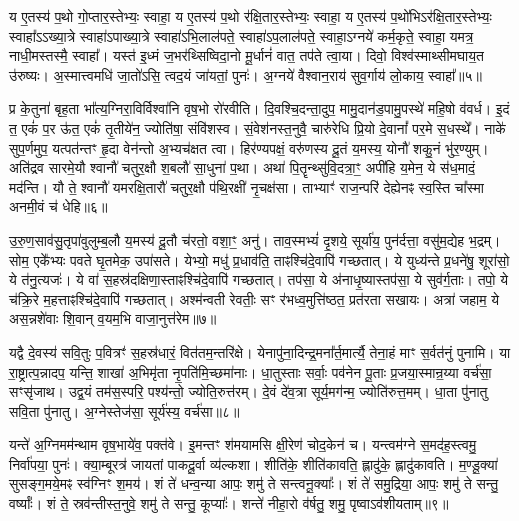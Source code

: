 य ए॒तस्य॑ प॒थो गो॒प्तार॒स्तेभ्यः॒ स्वाहा॒ य ए॒तस्य॑ प॒थो र॑क्षि॒तार॒स्तेभ्यः॒ स्वाहा॒ य ए॒तस्य॑ प॒थो॑भिऽर॑क्षि॒तार॒स्तेभ्यः॒ स्वाहा᳚\-ऽ\-ऽ\-ख्या॒त्रे स्वाहा॑ऽपाख्या॒त्रे स्वाहा॑ऽभि॒लाल॑पते॒ स्वाहा॑ऽ\-प॒लाल॑\-पते॒ स्वाहा॒ऽग्नये॑ कर्म॒कृते॒ स्वाहा॒ यमत्र॒ नाधी॒मस्तस्मै॒ स्वाहा᳚। 
यस्त॑ इ॒ध्मं ज॒भर॑थ्सिष्विदा॒नो मू॒र्धानं॑ वात॒ तप॑ते त्वा॒या। 
दिवो॒ विश्व॑स्माथ्सीमघाय॒त उ॑रुष्यः। 
अ॒स्मात्त्वमधि॑ जा॒तो॑ऽसि॒ त्वद॒यं जा॑यतां॒ पुनः॑। 
अ॒ग्नये॑ वैश्वान॒राय॑ सुव॒र्गाय॑ लो॒काय॒ स्वाहा᳚॥५॥
\anuvakamend[य ए॒तस्य॒ त्वत्पञ्च॑]

प्र के॒तुना॑ बृह॒ता भा᳚त्य॒ग्निरा॒विर्विश्वा॑नि वृष॒भो रो॑रवीति। 
दि॒वश्चि॒दन्ता॒दुप॒ मामु॒दान॑ड॒पामु॒पस्थे॑ महि॒षो व॑वर्ध। 
इ॒दं त॒ एकं॑ प॒र ऊ॑त॒ एकं॑ तृ॒तीये॑न॒ ज्योति॑षा॒ संवि॑शस्व। 
सं॒वेश॑नस्त॒नुवै॒ चारु॑रेधि प्रि॒यो दे॒वानां᳚ पर॒मे स॒धस्थे᳚। 
नाके॑ सुप॒र्णमुप॒ यत्पत॑न्तꣳ हृ॒दा वेन॑न्तो अ॒भ्यच॑क्षत त्वा। 
हिर॑ण्यपक्षं॒ वरु॑णस्य दू॒तं य॒मस्य॒ योनौ॑ शकु॒नं भु॑र॒ण्युम्। 
अति॑द्रव सारमे॒यौ श्वानौ॑ चतुर॒क्षौ श॒बलौ॑ सा॒धुना॑ प॒था। 
अथा॑ पि॒तॄन्थ्सु॑वि॒दत्रा॒ꣳ॒ अपी॑हि य॒मेन॒ ये स॑ध॒मादं॒ मद॑न्ति। 
यौ ते॒ श्वानौ॑ यमरक्षि॒तारौ॑ चतुर॒क्षौ प॑थि॒रक्षी॑ नृ॒चक्ष॑सा। 
ताभ्याꣳ॑ राज॒न्परि॑ देह्येनꣴ स्व॒स्ति चा᳚स्मा अनमी॒वं च॑ धेहि॥६॥

उ॒रु॒ण॒साव॑सु॒तृपा॑वुलुम्ब॒लौ य॒मस्य॑ दू॒तौ च॑रतो॒ वशा॒ꣳ॒ अनु॑। 
ताव॒स्मभ्यं॑ दृ॒शये॒ सूर्या॑य॒ पुन॑र्दत्ता॒ वसु॑म॒द्येह भ॒द्रम्। 
सोम॒ एके᳚भ्यः पवते घृ॒तमेक॒ उपा॑सते। 
येभ्यो॒ मधु॑ प्र॒धाव॑ति॒ ताꣴश्चि॑दे॒वापि॑ गच्छतात्। 
ये युध्य॑न्ते प्र॒धने॑षु॒ शूरा॑सो॒ ये त॑नु॒त्यजः॑। 
ये वा॑ स॒हस्र॑दक्षिणा॒स्ताꣴश्चि॑दे॒वापि॑ गच्छतात्। 
तप॑सा॒ ये अ॑नाधृ॒ष्यास्तप॑सा॒ ये सुव॑र्ग॒ताः। 
तपो॒ ये च॑क्रि॒रे म॒हत्ताꣴश्चि॑दे॒वापि॑ गच्छतात्। 
अश्म॑न्वती रेवतीः॒ सꣳ र॑भध्व॒मुत्ति॑ष्ठत॒ प्रत॑रता सखायः। 
अत्रा॑ जहाम॒ ये अस॒न्नशे॑वाः  शि॒वान् व॒यम॒भि वाजा॒नुत्त॑रेम॥७॥

यद्वै दे॒वस्य॑ सवि॒तुः प॒वित्रꣳ॑ स॒हस्र॑धारं॒  वित॑तम॒न्तरि॑क्षे। 
येनापु॑ना॒दिन्द्र॒मना᳚र्त॒मार्त्यै॒ तेना॒हं माꣳ स॒र्वत॑नुं पुनामि। 
या रा॒ष्ट्रात्प॒न्नादप॒ यन्ति॒ शाखा॑ अ॒भिमृ॑ता नृ॒पति॑मि॒च्छमा॑नाः। 
धा॒तुस्ताः सर्वाः॒ पव॑नेन पू॒ताः प्र॒जया॒स्मान्र॒य्या वर्च॑सा॒ सꣳसृ॑जाथ। 
उद्व॒यं तम॑स॒स्परि॒ पश्य॑न्तो॒ ज्योति॒रुत्त॑रम्। 
दे॒वं दे॑व॒त्रा सूर्य॒मग॑न्म॒ ज्योति॑रुत्त॒मम्। 
धा॒ता पु॑नातु सवि॒ता पु॑नातु। 
अ॒ग्नेस्तेज॑सा॒ सूर्य॑स्य॒ वर्च॑सा॥८॥
\anuvakamend[धे॒ह्युत्त॑रेमा॒ष्टौ च॑]

यन्ते॑ अ॒ग्निमम॑न्थाम वृष॒भाये॑व॒ पक्त॑वे। 
इ॒मन्तꣳ श॑मयामसि क्षी॒रेण॑ चोद॒केन॑ च। 
यन्त्वम॑ग्ने स॒मद॑ह॒स्त्वमु॒ निर्वा॑पया॒ पुनः॑। 
क्या॒म्बूरत्र॑ जायतां पाकदू॒र्वा व्य॑ल्कशा। 
शीति॑के॒ शीति॑कावति॒ ह्लादु॑के॒ ह्लादु॑कावति। 
म॒ण्डू॒क्या॑ सुसङ्ग॒मये॒मꣴ स्व॑ग्निꣳ श॒मय॑। 
शं ते॑ धन्व॒न्या आपः॒ शमु॑ ते सन्त्वनू॒क्याः᳚। 
शं ते॑ समु॒द्रिया॒ आपः॒ शमु॑ ते सन्तु॒ वर्ष्याः᳚। 
शं ते॒ स्रव॑न्तीस्त॒नुवे॒ शमु॑ ते सन्तु॒ कूप्याः᳚। 
शन्ते॑ नीहा॒रो व॑र्\mbox{}षतु॒ शमु॒ पृष्वाऽव॑शीयताम्॥९॥

